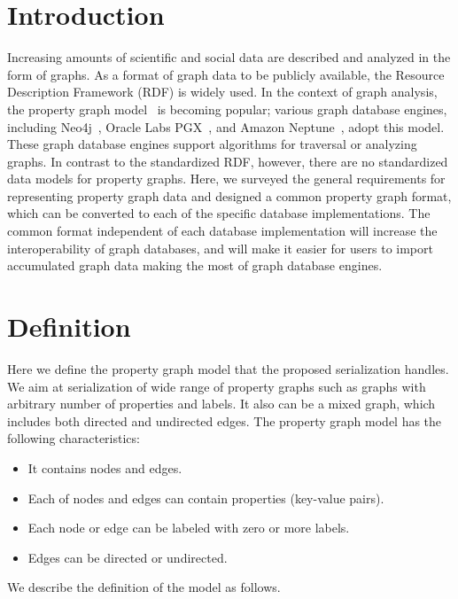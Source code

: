 \documentclass[runningheads]{llncs}
\begin{document}
\section{Introduction}
Increasing amounts of scientific and social data are described and analyzed in the form of graphs.
As a format of graph data to be publicly available, the Resource Description Framework (RDF) is widely used. 
In the context of graph analysis, the property graph model~\cite{angles} is becoming popular; various graph database engines, including Neo4j~\cite{neo4j}, Oracle Labs PGX~\cite{pgx}, and Amazon Neptune~\cite{neptune}, adopt this model. These graph database engines support algorithms for traversal or analyzing graphs. 
In contrast to the standardized RDF, however, there are no standardized data models for property graphs.
Here, we surveyed the general requirements for representing property graph data and designed a common property graph format, which can be converted to each of the specific database implementations. The common format independent of each database implementation will increase the interoperability of graph databases, and will make it easier for users to import accumulated graph data making the most of graph database engines.


\section{Definition}
Here we define the property graph model that the proposed serialization handles.
We aim at serialization of wide range of property graphs such as graphs with arbitrary number of properties and labels. It also can be a mixed graph, which includes both directed and undirected edges. The property graph model has the following characteristics:

\begin{itemize}
    \item It contains nodes and edges.
    \item Each of nodes and edges can contain properties (key-value pairs).
    \item Each node or edge can be labeled with zero or more labels.
    \item Edges can be directed or undirected.
\end{itemize}
We describe the definition of the model as follows.
\end{document}
